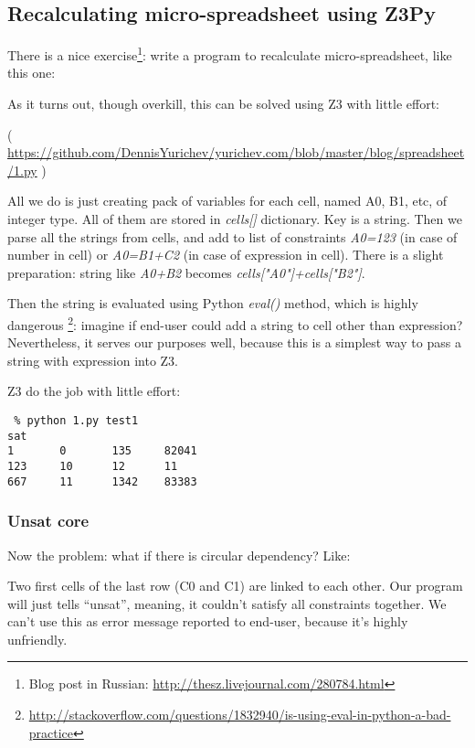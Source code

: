 \subsection{Recalculating micro-spreadsheet using Z3Py}

There is a nice exercise\footnote{Blog post in Russian: \url{http://thesz.livejournal.com/280784.html}}:
write a program to recalculate micro-spreadsheet, like this one:



As it turns out, though overkill, this can be solved using Z3 with little effort:



( \url{https://github.com/DennisYurichev/yurichev.com/blob/master/blog/spreadsheet/1.py} )

All we do is just creating pack of variables for each cell, named A0, B1, etc, of integer type.
All of them are stored in \textit{cells[]} dictionary.
Key is a string.
Then we parse all the strings from cells, and add to list of constraints \textit{A0=123}
(in case of number in cell) or \textit{A0=B1+C2} (in case of expression in cell).
There is a slight preparation: string like \textit{A0+B2} becomes \textit{cells["A0"]+cells["B2"]}.

Then the string is evaluated using Python \textit{eval()} method,
which is highly dangerous
\footnote{\url{http://stackoverflow.com/questions/1832940/is-using-eval-in-python-a-bad-practice}}:
imagine if end-user could add a string to cell other than expression?
Nevertheless, it serves our purposes well, because this is a simplest way to pass a string with expression into Z3.

Z3 do the job with little effort:

\begin{lstlisting}
 % python 1.py test1
sat
1       0       135     82041
123     10      12      11
667     11      1342    83383
\end{lstlisting}

\subsubsection{Unsat core}

Now the problem: what if there is circular dependency? Like:



Two first cells of the last row (C0 and C1) are linked to each other.
Our program will just tells ``unsat'', meaning, it couldn't satisfy all constraints together.
We can't use this as error message reported to end-user, because it's highly unfriendly.

